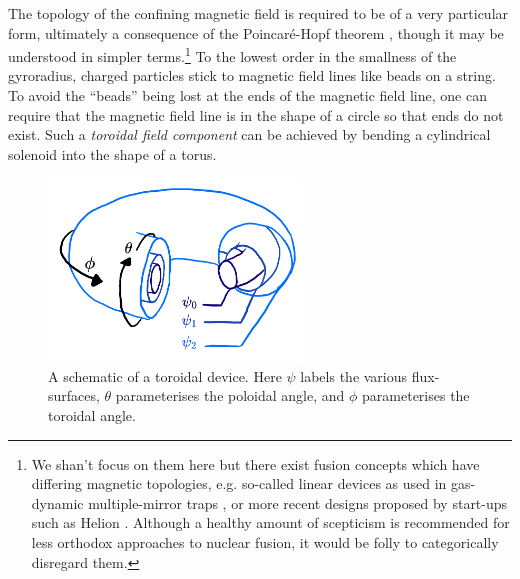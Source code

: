 The topology of the confining magnetic field is required to be of a very particular form, ultimately a consequence of the Poincar\'e-Hopf theorem \cite{hopf1927vektorfelder}, though it may be understood in simpler terms.\footnote{We shan't focus on them here but there exist fusion concepts which have differing magnetic topologies, e.g. so-called linear devices as used in gas-dynamic multiple-mirror traps \cite{burdakov2011concept,beklemishev2013novosibirsk,ivanov2017gas}, or more recent designs proposed by start-ups such as Helion \cite{waldrop2014fusion}. Although a healthy amount of scepticism is recommended for less orthodox approaches to nuclear fusion, it would be folly to categorically disregard them.} To the lowest order in the smallness of the gyroradius, charged particles stick to magnetic field lines like beads on a string. To avoid the ``beads'' being lost at the ends of the magnetic field line, one can require that the magnetic field line is in the shape of a circle so that ends do not exist. Such a {\it toroidal field component} can be achieved by bending a cylindrical solenoid into the shape of a torus. \par 
\begin{figure}
    \centering
    \includegraphics[width=0.6\textwidth]{3_chapters/0_introduction/img/tokamak.pdf}
    \caption{A schematic of a toroidal device. Here $\psi$ labels the various flux-surfaces, $\theta$ parameterises the poloidal angle, and $\phi$ parameterises the toroidal angle.}
    \label{fig: torus schematic}
\end{figure}
